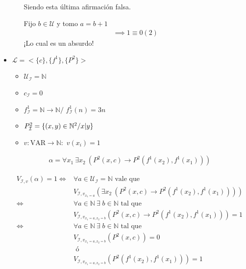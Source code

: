 \begin{itemize}
\begin{enumerate}
                Siendo esta última afirmación falsa.
        
                Fijo $b \in \mathcal{U}$ y tomo $a = b+1$
                \begin{gather*}
                    \implies 1 \equiv 0 (2)
                \end{gather*}
                ¡Lo cual es un absurdo!
        \end{enumerate}

        \item $\mathcal{L} = <\{ c \}, \{ f^1 \}, \{ P^2 \}>$

            \begin{itemize}
                \item $\mathcal{U}_{\mathcal{I}} = \mathbb{N}$
                \item $c_{\mathcal{I}} = 0$
                \item $f_{\mathcal{I}}^{1} = \mathbb{N} \to \mathbb{N}/$
                $f_{\mathcal{I}}^{1} (n) = 3n$
                \item $P_{\mathcal{I}}^{2} = 
                    \{ (x,y) \in \mathbb{N}^2 / \divides{x}{y} \}$
                \item $v: \mathrm{VAR} \to \mathbb{N}:$
                    $v(x_i) = 1$ 
            \end{itemize}

            \begin{gather*}
                \alpha = \forall x_1 ~ \exists x_2 ~ 
                \left( P^2(x,c) \to P^2(f^{1}(x_2),f^{1}(x_1))\right)
            \end{gather*}

            \begin{align*}
                V_{\mathcal{I}, v}(\alpha) = 1 \iff& 
                \forall a \in \mathcal{U}_{\mathcal{I}} = \mathbb{N}
                \text{ vale que} \\
                & V_{\mathcal{I}, v_{x_1 = a}} \left(\exists x_2 ~ 
                \left( P^2(x,c) \to P^2(f^{1}(x_2),f^{1}(x_1))\right)\right) \\
                \iff& \forall a \in \mathbb{N} ~ 
                \exists \; b \in \mathbb{N} \text{ tal que}\\
                &V_{\mathcal{I}, v_{x_1 = a, x_2 = b}}
                \left(P^2(x,c)\to P^2(f^{1}(x_2), f^{1}(x_1))\right) = 1 \\
                \iff& \forall a \in \mathbb{N} ~ 
                \exists \; b \in \mathbb{N} \text{ tal que}\\
                &V_{\mathcal{I}, v_{x_1 = a, x_2 = b}} \left(P^2(x,c)\right) = 0
                \\ & \text{ ó }\\
                &V_{\mathcal{I}, v_{x_1 = a, x_2 = b}} 
                \left(P^2(f^{1}(x_2), f^{1}(x_1))\right) = 1
            \end{align*}


\end{itemize}
